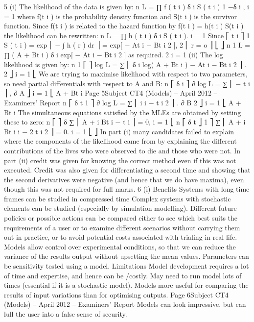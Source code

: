 \documentclass[a4paper,12pt]{article}
\begin{document}
\begin{enumerate}
5
(i)
The likelihood of the data is given by:
n
L = ∏ f ( t i ) δ i S ( t i ) 1 −δ i ,
i = 1
where f(t i ) is the probability density function and S(t i ) is the survivor function.
Since f(t i ) is related to the hazard function by
f(t i ) = h(t i ) S(t i )
the likelihood can be rewritten:
n
L = ∏ h ( t i ) δ i S ( t i ).
i = 1
Since
⎡ t i
⎤
1
S ( t i ) = exp ⎢ − ∫ h ( r ) dr ⎥ = exp[ − At i − Bt i 2 ],
2
⎢ r = o
⎥
⎣
⎦
n
1
L = ∏ ( A + Bt i ) δ i exp[ − At i − Bt i 2 ] as required.
2
i = 1
(ii)
The log likelihood is given by:
n
1
⎡
⎤
log L = ∑ ⎢ δ i log( A + Bt i ) − At i − Bt i 2 ⎥ .
2
⎦
i = 1 ⎣
We are trying to maximise likelihood with respect to two parameters,
so need partial differentials with respect to A and B:
n
⎡ δ i
⎤
∂
log L = ∑ ⎢
− t i ⎥ ,
∂ A
⎦
i = 1 ⎣ A + Bt i
Page 5Subject CT4 (Models) – April 2012 – Examiners’ Report
n
⎡ δ t
1 ⎤
∂
log L = ∑ ⎢ i i − t i 2 ⎥ .
∂ B
2 ⎦
i = 1 ⎣ A + Bt i
The simultaneous equations satisfied by the MLEs are obtained by
setting these to zero:
n
⎡
⎤
δ
∑ ⎢ A + i Bt i − t i ⎥ = 0,
i = 1 ⎣
n
⎡ δ t
⎦
1
⎤
∑ ⎢ A + i Bt i i − 2 t i 2 ⎥ = 0.
i = 1 ⎣
⎦
In part (i) many candidates failed to explain where the components of the likelihood came
from by explaining the different contributions of the lives who were observed to die and those
who were not. In part (ii) credit was given for knowing the correct method even if this was
not executed. Credit was also given for differentiating a second time and showing that the
second derivatives were negative (and hence that we do have maxima), even though this was
not required for full marks.
6
(i)
Benefits
Systems with long time frames can be studied in compressed time
Complex systems with stochastic elements can be studied (especially by
simulation modelling).
Different future policies or possible actions can be compared either to see which best
suits the requirements of a user or to examine different scenarios without carrying
them out in practice, or to avoid potential costs associated with trialing in real life.
Models allow control over experimental conditions, so that we can reduce the
variance of the results output without upsetting the mean values.
Parameters can be sensitivity tested using a model.
Limitations
Model development requires a lot of time and expertise, and hence can be /costly.
May need to run model lots of times (essential if it is a stochastic model).
Models more useful for comparing the results of input variations than for
optimising outputs.
Page 6Subject CT4 (Models) – April 2012 – Examiners’ Report
Models can look impressive, but can lull the user into a false sense of security.

\end{enumerate}
\end{document}
